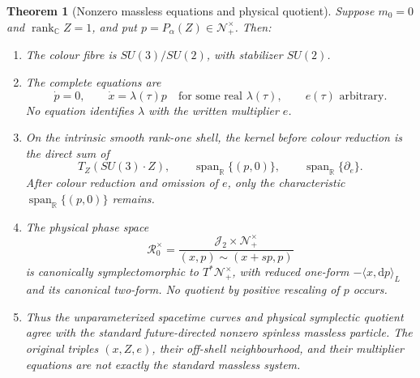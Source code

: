 \documentclass[11pt]{article}
\newtheorem{theorem}{Theorem}[section]
\newcommand{\J}{\mathcal J_2}
\newcommand{\Nfuture}{\mathcal N_+^\times}
\newcommand{\rankC}{\operatorname{rank}_{\mathbb C}}
\newcommand{\dd}{\mathrm d}
\newcommand{\SpanR}{\operatorname{span}_{\mathbb R}}
\begin{document}
\begin{theorem}[Nonzero massless equations and physical quotient]
\label{wpr:thm:massless}
Suppose \(m_0=0\) and \(\rankC Z=1\), and put
\(p=P_\alpha(Z)\in\Nfuture\).  Then:
\begin{enumerate}[label=\textup{(\alph*)}]
\item The colour fibre is \(SU(3)/SU(2)\), with stabilizer \(SU(2)\).
\item The complete equations are
\begin{equation}
 \dot p=0,\qquad
 \dot x=\lambda(\tau)p
 \quad\text{for some real }\lambda(\tau),\qquad
 e(\tau)\text{ arbitrary}.
 \label{wpr:eq:null-EL}
\end{equation}
No equation identifies \(\lambda\) with the written multiplier \(e\).
\item On the intrinsic smooth rank-one shell, the kernel before
colour reduction is the direct sum of
\[
 T_Z(SU(3)\cdot Z),\qquad
 \SpanR\{(p,0)\},\qquad
 \SpanR\{\partial_e\}.
\]
After colour reduction and omission of \(e\), only the characteristic
\(\SpanR\{(p,0)\}\) remains.
\item The physical phase space
\[
 \mathcal R_0^\times
 =
 \frac{\J\times\Nfuture}
 {(x,p)\sim(x+s p,p)}
\]
is canonically symplectomorphic to \(T^*\Nfuture\), with reduced
one-form \(-\langle x,\dd p\rangle_L\) and its canonical two-form.
No quotient by positive rescaling of \(p\) occurs.
\item Thus the unparameterized spacetime curves and physical
symplectic quotient agree with the standard future-directed nonzero
spinless massless particle.  The original triples \((x,Z,e)\), their
off-shell neighbourhood, and their multiplier equations are not
exactly the standard massless system.
\end{enumerate}
\end{theorem}
\end{document}

